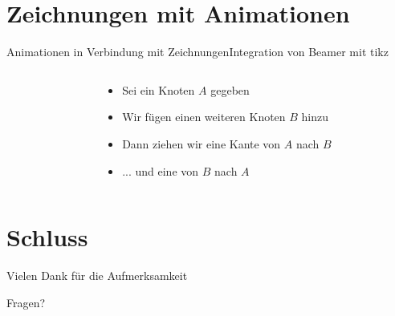\documentclass[t,aspectratio=169,dvipsnames]{beamer}
\begin{document}
\section{Zeichnungen mit Animationen}
\begin{frame}{Animationen in Verbindung mit Zeichnungen}{Integration von Beamer mit tikz}
\begin{columns}[T]
	\begin{column}[T]{0.5\textwidth}
		\begin{center}
		\end{center}
	\end{column}
	\begin{column}[T]{0.5\textwidth}
		\begin{itemize}
			\item Sei ein Knoten $A$ gegeben
			\item<2-> Wir fügen einen weiteren Knoten $B$ hinzu 
			\item<4-> Dann ziehen wir eine Kante von $A$ nach $B$
			\item<6-> ... und eine von $B$ nach $A$
		\end{itemize}
	\end{column}
\end{columns}	
\end{frame}

\section*{Schluss}
\begin{frame}
	\begin{center}
		\huge{Vielen Dank für die Aufmerksamkeit}
	\end{center}
	\begin{center}
		\Huge{Fragen?}
	\end{center}
\end{frame}

\begin{frame}[allowframebreaks]{\bibname}
\end{frame}
\end{document}
